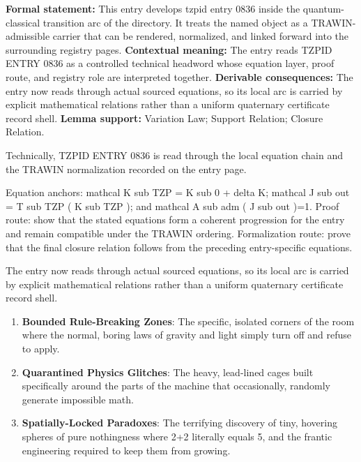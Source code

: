 \begingroup\footnotesize\setlength{\emergencystretch}{3em}\sloppy
\textbf{Formal statement:} This entry develops tzpid entry 0836 inside the quantum-classical transition arc of the directory. It treats the named object as a TRAWIN-admissible carrier that can be rendered, normalized, and linked forward into the surrounding registry pages. \textbf{Contextual meaning:} The entry reads TZPID ENTRY 0836 as a controlled technical headword whose equation layer, proof route, and registry role are interpreted together. \textbf{Derivable consequences:} The entry now reads through actual sourced equations, so its local arc is carried by explicit mathematical relations rather than a uniform quaternary certificate record shell. \textbf{Lemma support:} Variation Law; Support Relation; Closure Relation.\par
\endgroup

Technically, TZPID ENTRY 0836 is read through the local equation chain and the TRAWIN normalization recorded on the entry page.

Equation anchors: mathcal K sub TZP = K sub 0 + delta K; mathcal J sub out = T sub TZP ( K sub TZP ); and mathcal A sub adm ( J sub out )=1. Proof route: show that the stated equations form a coherent progression for the entry and remain compatible under the TRAWIN ordering. Formalization route: prove that the final closure relation follows from the preceding entry-specific equations.

The entry now reads through actual sourced equations, so its local arc is carried by explicit mathematical relations rather than a uniform quaternary certificate record shell.
\endgroup

\begin{enumerate}[leftmargin=1.6em,itemsep=6pt,topsep=4pt]
\item \textbf{Bounded Rule-Breaking Zones}: The specific, isolated corners of the room where the normal, boring laws of gravity and light simply turn off and refuse to apply.
\item \textbf{Quarantined Physics Glitches}: The heavy, lead-lined cages built specifically around the parts of the machine that occasionally, randomly generate impossible math.
\item \textbf{Spatially-Locked Paradoxes}: The terrifying discovery of tiny, hovering spheres of pure nothingness where 2+2 literally equals 5, and the frantic engineering required to keep them from growing.
\end{enumerate}

